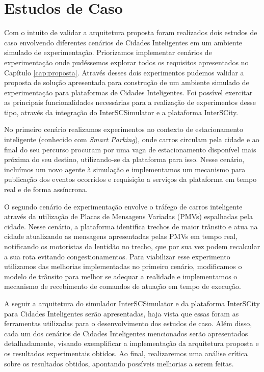 \chapter{Estudos de Caso}
\label{cap:estudos-de-caso}


Com o intuito de validar a arquitetura proposta foram realizados dois estudos de caso envolvendo diferentes cenários de Cidades Inteligentes em um ambiente simulado de experimentação.
Priorizamos implementar cenários de experimentação onde pudéssemos explorar todos os requisitos apresentados no Capítulo \ref{cap:proposta}.
Através desses dois experimentos pudemos validar a proposta de solução apresentada para construção de um ambiente simulado de experimentação para plataformas de Cidades Inteligentes.
Foi possível exercitar as principais funcionalidades necessárias para a realização de experimentos desse tipo, através da integração do InterSCSimulator e a plataforma InterSCity.

No primeiro cenário realizamos experimentos no contexto de estacionamento inteligente (conhecido com \textit{Smart Parking}), onde carros circulam pela cidade e ao
final do seu percurso procuram por uma vaga de estacionamento disponível mais próxima do seu destino, utilizando-se da plataforma para isso.
Nesse cenário, incluímos um novo agente à simulação e implementamos um mecanismo para publicação dos eventos ocorridos e requisição a serviços da plataforma em tempo real
e de forma assíncrona.

O segundo cenário de experimentação envolve o tráfego de carros inteligente através da utilização de Placas de Mensagens Variadas (PMVs) espalhadas pela cidade.
Nesse cenário, a plataforma identifica trechos de maior trânsito e atua na cidade atualizando as mensagens apresentadas pelas PMVs em tempo real, notificando os
motoristas da lentidão no trecho, que por sua vez podem recalcular a sua rota evitando congestionamentos.
Para viabilizar esse experimento utilizamos das melhorias implementadas no primeiro cenário, modificamos o modelo de trânsito para melhor se adequar a realidade e
implementamos o mecanismo de recebimento de comandos de atuação em tempo de execução.

A seguir a arquitetura do simulador InterSCSimulator e da plataforma InterSCity para Cidades Inteligentes serão apresentadas, haja vista que essas foram as ferramentas utilizadas para o desenvolvimento
dos estudos de caso.
Além disso, cada um dos cenários de Cidades Inteligentes mencionados serão apresentados detalhadamente, visando exemplificar a implementação da arquitetura proposta e os resultados experimentais obtidos.
Ao final, realizaremos uma análise crítica sobre os resultados obtidos, apontando possíveis melhorias a serem feitas.

